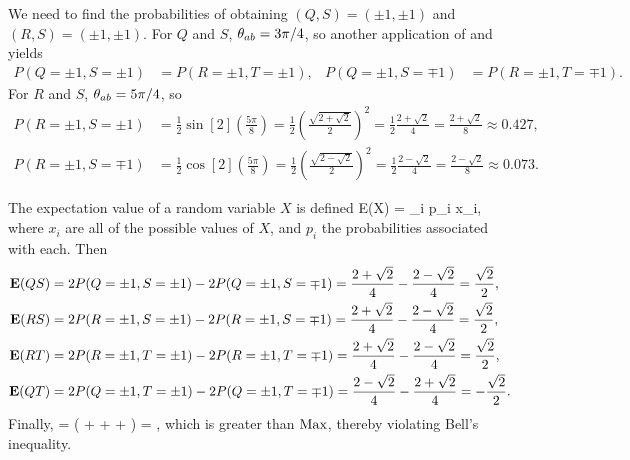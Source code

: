 \begin{solution}
	We need to find the probabilities of obtaining $(Q,S) = (\pm1, \pm1)$ and $(R,S) = (\pm1, \pm1)$.  For $Q$ and $S$, $\theta_{ab} = 3\pi/4$, so another application of  and  yields
	\begin{align*}
		P(Q=\pm1, S=\pm1) &= P(R=\pm1, T=\pm1), &
		P(Q=\pm1, S=\mp1) &= P(R=\pm1, T=\mp1).
	\end{align*}
	For $R$ and $S$, $\theta_{ab} = 5\pi/4$, so
	\begin{align*}
		P(R=\pm1, S=\pm1) &= \frac{1}{2} \sin[2](\frac{5\pi}{8})
		= \frac{1}{2} \left( \frac{\sqrt{2 + \sqrt{2}}}{2} \right)^2
		= \frac{1}{2} \frac{2 + \sqrt{2}}{4}
		= \frac{2 + \sqrt{2}}{8}
		\approx 0.427, \\
		P(R=\pm1, S=\mp1) &= \frac{1}{2} \cos[2](\frac{5\pi}{8})
		= \frac{1}{2} \left( \frac{\sqrt{2 - \sqrt{2}}}{2} \right)^2
		= \frac{1}{2} \frac{2 - \sqrt{2}}{4}
		= \frac{2 - \sqrt{2}}{8}
		\approx 0.073.
	\end{align*}
	
	The expectation value of a random variable $X$ is defined
	\beq
		E(X) = \sum_{i} p_i x_i,
	\eeq
	where $x_i$ are all of the possible values of $X$, and $p_i$ the probabilities associated with each.  Then
	\begin{align*}
		\vb{E}(QS) &= 2 P(Q=\pm1, S=\pm1) - 2 P(Q=\pm1, S=\mp1)
		= \frac{2 + \sqrt{2}}{4} - \frac{2 - \sqrt{2}}{4}
		= \frac{\sqrt{2}}{2}, \\
		\vb{E}(RS) &= 2 P(R=\pm1, S=\pm1) - 2 P(R=\pm1, S=\mp1)
		= \frac{2 + \sqrt{2}}{4} - \frac{2 - \sqrt{2}}{4}
		= \frac{\sqrt{2}}{2}, \\
		\vb{E}(RT) &= 2 P(R=\pm1, T=\pm1) - 2 P(R=\pm1, T=\mp1)
		= \frac{2 + \sqrt{2}}{4} - \frac{2 - \sqrt{2}}{4}
		= \frac{\sqrt{2}}{2}, \\
		\vb{E}(QT) &= 2 P(Q=\pm1, T=\pm1) - 2 P(Q=\pm1, T=\mp1)
		= \frac{2 - \sqrt{2}}{4} - \frac{2 + \sqrt{2}}{4}
		= -\frac{\sqrt{2}}{2}.
	\end{align*}
	Finally,
	\beq
		=  \left(  +  +  +  \right)
		= ,
	\eeq
	which is greater than $\text{Max}$, thereby violating Bell's inequality.
\end{solution}